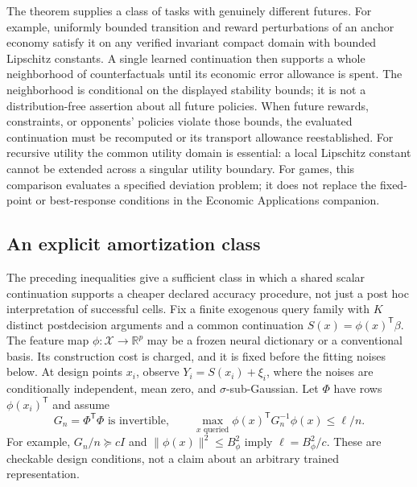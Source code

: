 \documentclass[ecta,nameyear,draft]{econsocart}
\theoremstyle{definition}
\theoremstyle{remark}
\newcommand{\R}{\mathbb R}
\begin{document}
The theorem supplies a class of tasks with genuinely different futures.
For example, uniformly bounded transition and reward perturbations of an
anchor economy satisfy it on any verified invariant compact domain with
bounded Lipschitz constants. A single learned continuation then supports a
whole neighborhood of counterfactuals until its economic error allowance is
spent. The neighborhood is conditional on the displayed stability bounds;
it is not a distribution-free assertion about all future policies. When
future rewards, constraints, or opponents' policies violate those bounds,
the evaluated continuation must be recomputed or its transport allowance
reestablished. For recursive utility the common utility domain is essential:
a local Lipschitz constant cannot be extended across a singular utility
boundary. For games, this comparison evaluates a specified deviation problem;
it does not replace the fixed-point or best-response conditions in the
Economic Applications companion.

\subsection{An explicit amortization class}
The preceding inequalities give a sufficient class in which a shared scalar
continuation supports a cheaper declared accuracy procedure, not just a
post hoc interpretation of successful cells. Fix a finite exogenous query
family with $K$ distinct postdecision arguments and a common continuation
$S(x)=\phi(x)^{\mathsf T}\beta$. The feature map $\phi:\mathcal X\to\R^p$
may be a frozen neural dictionary or a conventional basis. Its construction
cost is charged, and it is fixed before the fitting noises below. At design
points $x_i$, observe $Y_i=S(x_i)+\xi_i$, where the noises are conditionally
independent, mean zero, and $\sigma$-sub-Gaussian. Let $\Phi$ have rows
$\phi(x_i)^{\mathsf T}$ and assume
\[
 G_n=\Phi^{\mathsf T}\Phi\text{ is invertible},\qquad
 \max_{x\text{ queried}}\phi(x)^{\mathsf T}G_n^{-1}\phi(x)\leq\ell/n.
\]
For example, $G_n/n\succeq cI$ and $\|\phi(x)\|^2\leq B_\phi^2$
imply $\ell=B_\phi^2/c$. These are checkable design conditions, not a
claim about an arbitrary trained representation.
\end{document}
